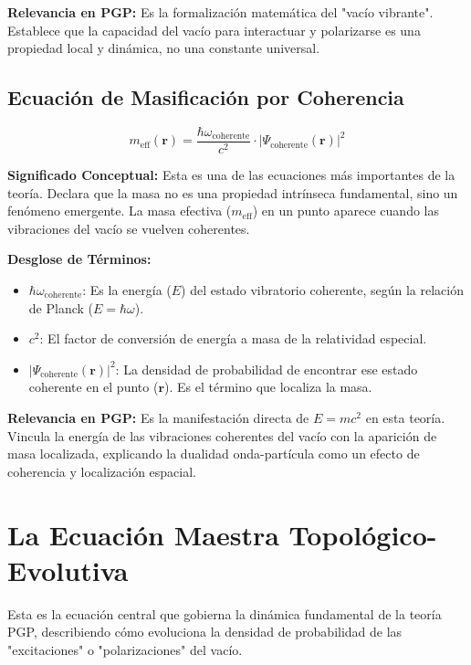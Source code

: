 \documentclass{article}
\begin{document}
\textbf{Relevancia en PGP:} Es la formalización matemática del "vacío vibrante". Establece que la capacidad del vacío para interactuar y polarizarse es una propiedad local y dinámica, no una constante universal.

\subsection{Ecuación de Masificación por Coherencia}

\begin{equation*}
m_{\text{eff}}(\mathbf{r}) = \frac{\hbar\omega_{\text{coherente}}}{c^2} \cdot \left|\Psi_{\text{coherente}}(\mathbf{r})\right|^2
\end{equation*}

\textbf{Significado Conceptual:} Esta es una de las ecuaciones más importantes de la teoría. Declara que la masa no es una propiedad intrínseca fundamental, sino un fenómeno emergente. La masa efectiva ($m_{\text{eff}}$) en un punto aparece cuando las vibraciones del vacío se vuelven coherentes.

\textbf{Desglose de Términos:}
\begin{itemize}
    \item $\hbar\omega_{\text{coherente}}$: Es la energía ($E$) del estado vibratorio coherente, según la relación de Planck ($E=\hbar\omega$).
    \item $c^2$: El factor de conversión de energía a masa de la relatividad especial.
    \item $\left|\Psi_{\text{coherente}}(\mathbf{r})\right|^2$: La densidad de probabilidad de encontrar ese estado coherente en el punto ($\mathbf{r}$). Es el término que localiza la masa.
\end{itemize}

\textbf{Relevancia en PGP:} Es la manifestación directa de $E=mc^2$ en esta teoría. Vincula la energía de las vibraciones coherentes del vacío con la aparición de masa localizada, explicando la dualidad onda-partícula como un efecto de coherencia y localización espacial.

\section{La Ecuación Maestra Topológico-Evolutiva}

Esta es la ecuación central que gobierna la dinámica fundamental de la teoría PGP, describiendo cómo evoluciona la densidad de probabilidad de las "excitaciones" o "polarizaciones" del vacío.
\end{document}
